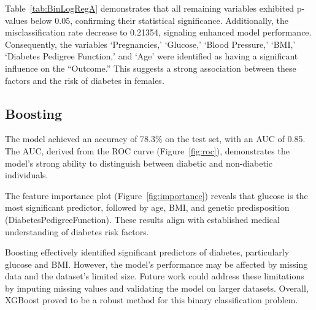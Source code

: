 \documentclass[12pt]{article}
\begin{document}
Table~\ref{tab:BinLogRegA} demonstrates that all remaining variables exhibited p-values below 0.05, confirming their statistical significance. Additionally, the misclassification rate decrease to 0.21354, signaling enhanced model performance. Consequently, the variables ‘Pregnancies,’ ‘Glucose,’ ‘Blood Pressure,’ ‘BMI,’ ‘Diabetes Pedigree Function,’ and ‘Age’ were identified as having a significant influence on the “Outcome.” This suggests a strong association between these factors and the risk of diabetes in females.

\subsection{Boosting}

The model achieved an accuracy of 78.3\% on the test set, with an AUC of 0.85. The AUC, derived from the ROC curve (Figure~\ref{fig:roc}), demonstrates the model's strong ability to distinguish between diabetic and non-diabetic individuals.

The feature importance plot (Figure~\ref{fig:importance}) reveals that glucose is the most significant predictor, followed by age, BMI, and genetic predisposition (DiabetesPedigreeFunction). These results align with established medical understanding of diabetes risk factors.



Boosting effectively identified significant predictors of diabetes, particularly glucose and BMI. However, the model's performance may be affected by missing data and the dataset's limited size. Future work could address these limitations by imputing missing values and validating the model on larger datasets. Overall, XGBoost proved to be a robust method for this binary classification problem.
\end{document}

